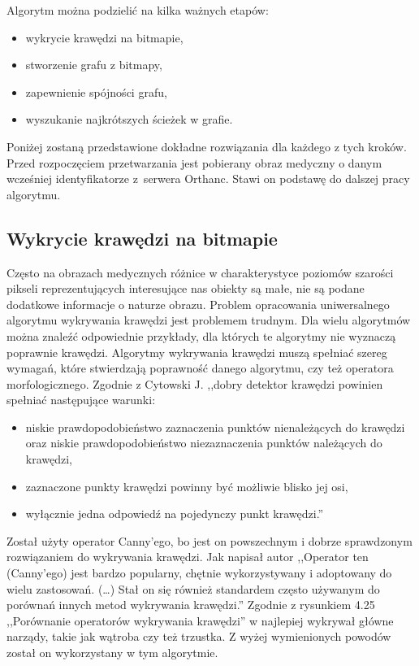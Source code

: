 \documentclass[a4paper,11pt,twoside,openright]{report}
\theoremstyle{definition}
\begin{document}
Algorytm można podzielić na kilka ważnych etapów:

\begin{itemize}[noitemsep]
\item {wykrycie krawędzi na bitmapie,}
\item {stworzenie grafu z bitmapy,}
\item {zapewnienie spójności grafu,}
\item {wyszukanie najkrótszych ścieżek w grafie.}
\end{itemize}

Poniżej zostaną przedstawione dokładne rozwiązania dla każdego z tych kroków.
Przed rozpoczęciem przetwarzania jest pobierany obraz medyczny o danym wcześniej
identyfikatorze z~serwera Orthanc. Stawi on podstawę do dalszej pracy algorytmu.


\subsection {Wykrycie krawędzi na bitmapie}

Często na obrazach medycznych różnice w charakterystyce poziomów szarości pikseli
reprezentujących interesujące nas obiekty są małe, nie są podane dodatkowe informacje
o naturze obrazu. Problem opracowania uniwersalnego algorytmu wykrywania krawędzi
jest problemem trudnym. Dla wielu algorytmów można znaleźć odpowiednie przykłady,
dla których te algorytmy nie wyznaczą poprawnie krawędzi. Algorytmy wykrywania
krawędzi muszą spełniać szereg wymagań, które stwierdzają poprawność danego algorytmu,
czy też operatora morfologicznego. Zgodnie z Cytowski J. \cite{Cyfrowe przetwarzanie
obrazów medycznych} ,,dobry detektor krawędzi powinien spełniać następujące warunki:
\begin{itemize}[noitemsep]
\item {niskie prawdopodobieństwo zaznaczenia punktów nienależących do krawędzi
oraz niskie prawdopodobieństwo niezaznaczenia punktów należących do krawędzi,}
\item {zaznaczone punkty krawędzi powinny być możliwie blisko jej osi,}
\item {wyłącznie jedna odpowiedź na pojedynczy punkt krawędzi.''}
\end{itemize}

Został użyty operator Canny'ego, bo jest on powszechnym i dobrze sprawdzonym
rozwiązaniem do wykrywania krawędzi. Jak napisał autor \cite{Cyfrowe przetwarzanie obrazów medycznych}
,,Operator ten (Canny'ego) jest bardzo popularny, chętnie wykorzystywany i adoptowany
do wielu zastosowań. (\dots) Stał on się również standardem często używanym do
porównań innych metod wykrywania krawędzi.'' Zgodnie z rysunkiem 4.25
,,Porównanie operatorów wykrywania krawędzi'' w \cite{Cyfrowe przetwarzanie obrazów medycznych}
najlepiej wykrywał główne narządy, takie jak wątroba czy też trzustka. Z wyżej
wymienionych powodów został on wykorzystany w tym algorytmie.
\end{document}
